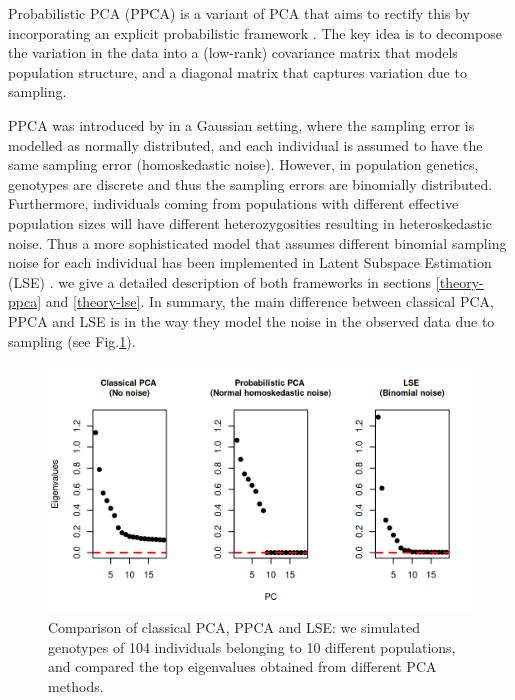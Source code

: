 \documentclass[12pt]{article}
\begin{document}
Probabilistic PCA (PPCA) is a variant of PCA that aims to rectify this by incorporating an explicit probabilistic framework \citep{tipping_probabilistic_1999-1}. The key idea is to decompose the variation in the data into a (low-rank) covariance matrix that models population structure, and a diagonal matrix that captures variation due to sampling.

PPCA was introduced by \citep{tipping_probabilistic_1999-1} in a Gaussian setting, where the sampling error is modelled as normally distributed, and each individual is assumed to have the same sampling error (homoskedastic noise). However, in population genetics, genotypes are discrete and thus the sampling errors are binomially distributed. Furthermore, individuals coming from populations with different effective population sizes will have different heterozygosities resulting in heteroskedastic noise. Thus a more sophisticated model that assumes different binomial sampling noise for each individual has been implemented in Latent Subspace Estimation (LSE) \citep{chen_consistent_2015, van_waaij_evaluation_2023, cabreros_likelihood-free_2019}. we give a detailed description of both frameworks in sections \ref{theory-ppca} and \ref{theory-lse}. In summary, the main difference between classical PCA, PPCA and LSE is in the way they model the noise in the observed data due to sampling (see Fig.\ref{fig1:pca_ppca}). 

\begin{figure}[ht!]
    \includegraphics[width=16.5cm]{Images/Figures/pca_all_genetic.png}
    \centering
    \caption{Comparison of classical PCA, PPCA and LSE: we simulated genotypes of 104 individuals belonging to 10 different populations, and compared the top eigenvalues obtained from different PCA methods.}
    \label{fig1:pca_ppca} 
\end{figure}
\end{document}
